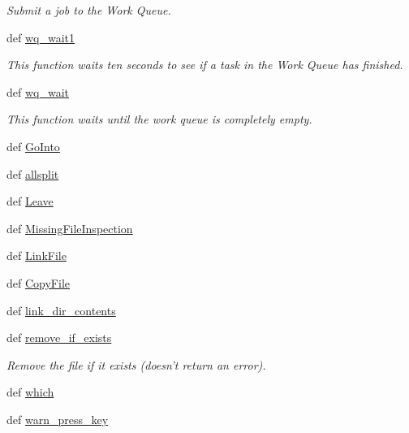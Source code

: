 \begin{DoxyCompactItemize}
\begin{DoxyCompactList}\small\item\em Submit a job to the Work Queue. \end{DoxyCompactList}\item 
def \hyperlink{namespaceforcebalance_1_1nifty_a374aac2ef003be02fab49b20ff0a82f0}{wq\-\_\-wait1}
\begin{DoxyCompactList}\small\item\em This function waits ten seconds to see if a task in the Work Queue has finished. \end{DoxyCompactList}\item 
def \hyperlink{namespaceforcebalance_1_1nifty_a576de8c5b6f236280e07e73e39b2ab7c}{wq\-\_\-wait}
\begin{DoxyCompactList}\small\item\em This function waits until the work queue is completely empty. \end{DoxyCompactList}\item 
def \hyperlink{namespaceforcebalance_1_1nifty_ad432b88307e1178b0690c0d350b1af36}{Go\-Into}
\item 
def \hyperlink{namespaceforcebalance_1_1nifty_ac9ab6c5543a2e3080061e0024850edf3}{allsplit}
\item 
def \hyperlink{namespaceforcebalance_1_1nifty_ab04e8690d099db2379dc860e0d040120}{Leave}
\item 
def \hyperlink{namespaceforcebalance_1_1nifty_ae87c7def5f8edf2ec30737bdb1d2636f}{Missing\-File\-Inspection}
\item 
def \hyperlink{namespaceforcebalance_1_1nifty_ab182a9da2a2f42cf45942fbee6acf9b1}{Link\-File}
\item 
def \hyperlink{namespaceforcebalance_1_1nifty_af5f0e1ba7689f1ab40383ba0480560a9}{Copy\-File}
\item 
def \hyperlink{namespaceforcebalance_1_1nifty_a0cf4e58f90acf20e3d6224be2354082c}{link\-\_\-dir\-\_\-contents}
\item 
def \hyperlink{namespaceforcebalance_1_1nifty_a25efa4d501ad852a234721af18978f7e}{remove\-\_\-if\-\_\-exists}
\begin{DoxyCompactList}\small\item\em Remove the file if it exists (doesn't return an error). \end{DoxyCompactList}\item 
def \hyperlink{namespaceforcebalance_1_1nifty_aa1ff334c4b4e30e91978b91d9a9ec065}{which}
\item 
def \hyperlink{namespaceforcebalance_1_1nifty_abb8f59044961a12588e0653c2baa8b01}{warn\-\_\-press\-\_\-key}

\end{DoxyCompactItemize}
